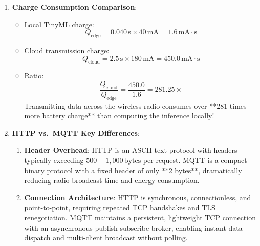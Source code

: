 \begin{enumerate}
    \item \textbf{Charge Consumption Comparison}:
    \begin{itemize}
        \item Local TinyML charge:
        \begin{equation*}
        Q_{\text{edge}} = 0.040\,\text{s} \times 40\,\text{mA} = 1.6\,\text{mA}\cdot\text{s}
        \end{equation*}
        \item Cloud transmission charge:
        \begin{equation*}
        Q_{\text{cloud}} = 2.5\,\text{s} \times 180\,\text{mA} = 450.0\,\text{mA}\cdot\text{s}
        \end{equation*}
        \item Ratio:
        \begin{equation*}
        \frac{Q_{\text{cloud}}}{Q_{\text{edge}}} = \frac{450.0}{1.6} = \mathbf{281.25\times}
        \end{equation*}
        Transmitting data across the wireless radio consumes over **281 times more battery charge** than computing the inference locally!
    \end{itemize}

    \item \textbf{HTTP vs.\ MQTT Key Differences}:
    \begin{enumerate}
        \item \textbf{Header Overhead}: HTTP is an ASCII text protocol with headers typically exceeding $500 - 1{,}000\,\text{bytes}$ per request. MQTT is a compact binary protocol with a fixed header of only **2 bytes**, dramatically reducing radio broadcast time and energy consumption.
        \item \textbf{Connection Architecture}: HTTP is synchronous, connectionless, and point-to-point, requiring repeated TCP handshakes and TLS renegotiation. MQTT maintains a persistent, lightweight TCP connection with an asynchronous publish-subscribe broker, enabling instant data dispatch and multi-client broadcast without polling.
    \end{enumerate}
\end{enumerate}
